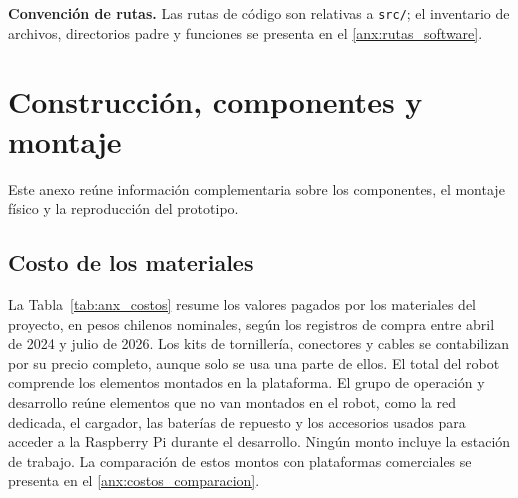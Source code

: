 \renewcommand{\appendixname}{ANEXO}
\renewcommand{\appendixtocname}{ANEXOS}
\renewcommand{\appendixpagename}{ANEXOS}

\appendix
\addappheadtotoc
\appendixpage

\renewcommand{\thesection}{ANEXO \arabic{section}}
\renewcommand{\thesubsection}{\thesection .\arabic{subsection}}

\begin{appendices}

\renewcommand{\theequation}{A\arabic{section}.\arabic{equation}}
\renewcommand{\thetable}{A\arabic{section}.\arabic{table}}
\renewcommand{\thefigure}{A\arabic{section}.\arabic{figure}}

\noindent\textbf{Convención de rutas.} Las rutas de código son relativas a \texttt{src/}; el inventario de archivos, directorios padre y funciones se presenta en el \ref{anx:rutas_software}.

\section{Construcción, componentes y montaje}
\label{anx:componentes}

Este anexo reúne información complementaria sobre los componentes, el montaje físico y la reproducción del prototipo.

\subsection{Costo de los materiales}
\label{anx:costos}

La Tabla~\ref{tab:anx_costos} resume los valores pagados por los materiales del
proyecto, en pesos chilenos nominales, según los registros de compra entre abril
de 2024 y julio de 2026. Los kits de tornillería, conectores y cables se
contabilizan por su precio completo, aunque solo se usa una parte de ellos. El
total del robot comprende los elementos montados en la plataforma. El grupo de
operación y desarrollo reúne elementos que no van montados en el robot, como la
red dedicada, el cargador, las baterías de repuesto y los accesorios usados
para acceder a la Raspberry Pi durante el desarrollo. Ningún monto incluye la
estación de trabajo. La comparación de estos montos con plataformas
comerciales se presenta en el \ref{anx:costos_comparacion}.


\end{appendices}
